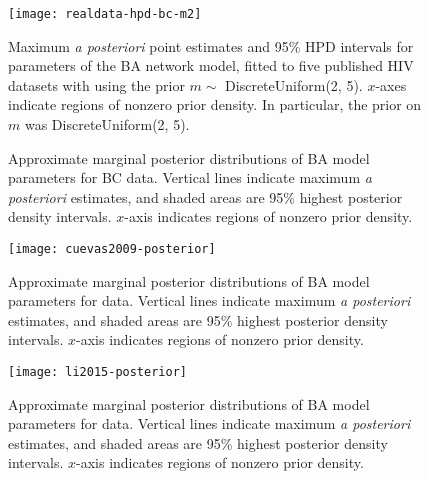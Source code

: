 \begin{figure}[ht]
  \texttt{[image: realdata-hpd-bc-m2]}
  \vspace{8pt}
  \caption[
      Maximum \textit{a posteriori} point estimates and 95\% HPD intervals for
      parameters of the BA network model, fitted to five published HIV datasets
      with  using the prior $m \sim DiscreteUniform(2, 5)$.
  ]{
      Maximum \textit{a posteriori} point estimates and 95\% HPD intervals for
      parameters of the BA network model, fitted to five published HIV datasets
      with  using the prior $m \sim$ DiscreteUniform(2, 5).
      $x$-axes indicate regions of nonzero prior density. In particular, the
      prior on $m$ was DiscreteUniform(2, 5).
  }
  \label{fig:abchpdm2}
\end{figure}

\clearpage

\begin{figure}[ht]
  \caption[
      Approximate marginal posterior distributions of BA model parameters for
      BC data.
  ]
  {
      Approximate marginal posterior distributions of BA model parameters for
      BC data. Vertical lines indicate maximum \textit{a posteriori} estimates,
      and shaded areas are 95\% highest posterior density intervals. $x$-axis
      indicates regions of nonzero prior density.
  }
  \label{fig:bctree}
\end{figure}

\begin{figure}[ht]
  \texttt{[image: cuevas2009-posterior]}
  \caption[
      Approximate marginal posterior distributions of BA model parameters for
      \textcite{cuevas2009hiv} data. 
  ]{
      Approximate marginal posterior distributions of BA model parameters for
      \textcite{cuevas2009hiv} data. Vertical lines indicate maximum \textit{a
      posteriori} estimates, and shaded areas are 95\% highest posterior
      density intervals. $x$-axis indicates regions of nonzero prior density.
  }
  \label{fig:cuevas}
\end{figure}

\begin{figure}[ht]
  \texttt{[image: li2015-posterior]}
  \caption[
      Approximate marginal posterior distributions of BA model parameters for
      \textcite{li2015hiv} data. 
  ]{
      Approximate marginal posterior distributions of BA model parameters for
      \textcite{li2015hiv} data. Vertical lines indicate maximum \textit{a
      posteriori} estimates, and shaded areas are 95\% highest posterior
      density intervals. $x$-axis indicates regions of nonzero prior density.
  }
  \label{fig:li}
\end{figure}

